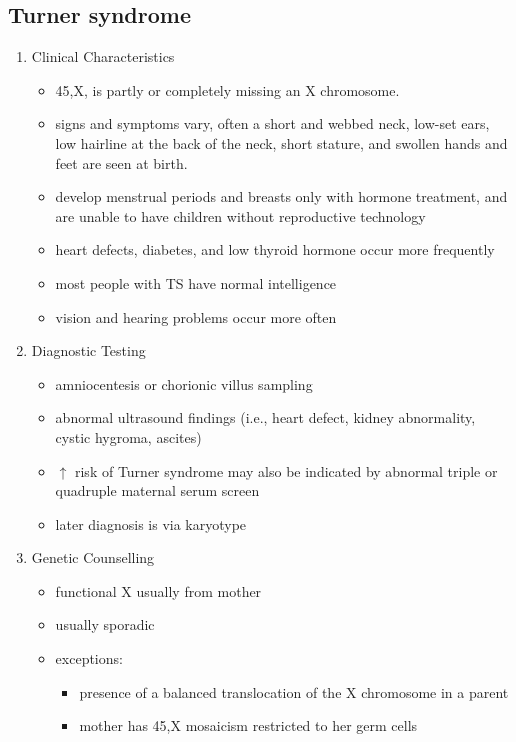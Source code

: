 \documentclass[12pt]{scrartcl}
\begin{document}
\subsection{Turner syndrome}
\label{sec:org7fa9d37}
\begin{enumerate}
\item Clinical Characteristics
\label{sec:org0dd2698}
\begin{itemize}
\item 45,X, \female is partly or completely missing an X chromosome.
\item signs and symptoms vary, often a short and webbed neck, low-set
ears, low hairline at the back of the neck, short stature, and
swollen hands and feet are seen at birth.
\item develop menstrual periods and breasts only with hormone treatment,
and are unable to have children without reproductive technology
\item heart defects, diabetes, and low thyroid hormone occur more
frequently
\item most people with TS have normal intelligence
\item vision and hearing problems occur more often
\end{itemize}
\item Diagnostic Testing
\label{sec:org2e002e7}
\begin{itemize}
\item amniocentesis or chorionic villus sampling
\item abnormal ultrasound findings (i.e., heart defect, kidney
abnormality, cystic hygroma, ascites)
\item \(\uparrow\) risk of Turner syndrome may also be indicated by abnormal
triple or quadruple maternal serum screen
\item later diagnosis is via karyotype
\end{itemize}
\item Genetic Counselling
\label{sec:orgbeb9cc7}
\begin{itemize}
\item functional X usually from mother
\item usually sporadic
\item exceptions:
\begin{itemize}
\item presence of a balanced translocation of the X chromosome in a parent
\item mother has 45,X mosaicism restricted to her germ cells
\end{itemize}
\end{itemize}
\end{enumerate}
\end{document}
